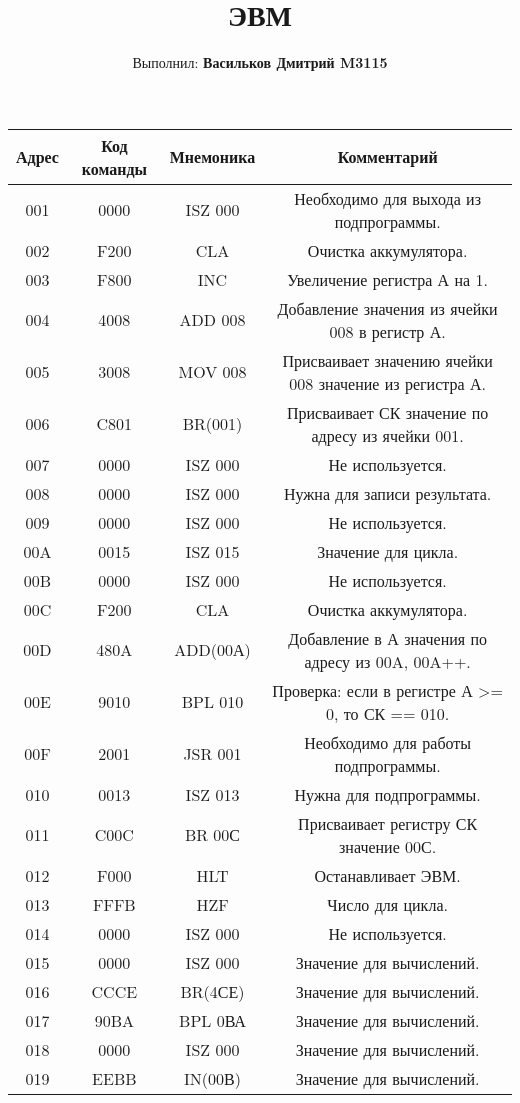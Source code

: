 \documentclass{article}
\title{ЭВМ}
\author{Выполнил: \textbf{Васильков Дмитрий M3115}}
\begin{document}
\maketitle
\begin{tabular}{|c|c|c|c|}
    \hline
    Адрес & Код команды & Мнемоника & Комментарий \\ \hline
    001 & 0000 & ISZ 000& Необходимо для выхода из подпрограммы. \\ \hline
    002 & F200 & CLA & Очистка аккумулятора. \\ \hline
    003 & F800 & INC & Увеличение регистра А на 1. \\ \hline
    004 & 4008 & ADD 008 & Добавление значения из ячейки 008 в регистр А. \\ \hline
    005 & 3008 & MOV 008 & Присваивает значению ячейки 008 значение из регистра А. \\ \hline
    006 & C801 & BR(001) & Присваивает СК значение по адресу из ячейки 001. \\ \hline
    007 & 0000 & ISZ 000 & Не используется. \\ \hline
    008 & 0000 & ISZ 000 & Нужна для записи результата. \\ \hline
    009 & 0000 & ISZ 000 & Не используется. \\ \hline
    00A & 0015 & ISZ 015& Значение для цикла. \\ \hline
    00B & 0000 & ISZ 000 & Не используется. \\ \hline
    00C & F200 & CLA & Очистка аккумулятора. \\ \hline
    00D & 480A & ADD(00А) & Добавление в А значения по адресу из 00A, 00A++. \\ \hline
    00E & 9010 & BPL 010 & Проверка: если в регистре А >= 0, то СК == 010. \\ \hline
    00F & 2001 & JSR 001 & Необходимо для работы подпрограммы. \\ \hline
    010 & 0013 & ISZ 013 & Нужна для подпрограммы. \\ \hline
    011 & C00C & BR 00С& Присваивает регистру СК значение 00С. \\ \hline
    012 & F000 & HLT & Останавливает ЭВМ. \\ \hline
    013 & FFFB & HZF & Число для цикла. \\ \hline
    014 & 0000 & ISZ 000& Не используется. \\ \hline
    015 & 0000 & ISZ 000& Значение для вычислений. \\ \hline
    016 & CCCE & BR(4СЕ) & Значение для вычислений. \\ \hline
    017 & 90BA & BPL 0ВА& Значение для вычислений. \\ \hline
    018 & 0000 & ISZ 000& Значение для вычислений. \\ \hline
    019 & EEBB & IN(00В) & Значение для вычислений. \\ \hline
\end{tabular}
\end{document}
